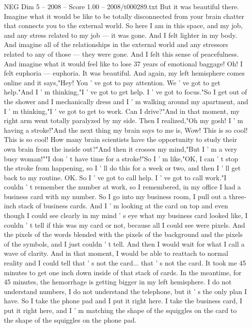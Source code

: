 \begin{textsample}{NEG Dim 5 – 2008 – Score 1.00 – 2008/t000289.txt}
But it was beautiful there.
Imagine what it would be like to be totally disconnected from your brain chatter that connects you to the external world.
So here I am in this space, and my job, and any stress related to my job — it was gone.
And I felt lighter in my body.
And imagine all of the relationships in the external world and any stressors related to any of those — they were gone.
And I felt this sense of peacefulness.
And imagine what it would feel like to lose 37 years of emotional baggage!
Oh!
I felt euphoria — euphoria.
It was beautiful.
And again, my left hemisphere comes online and it says,"Hey!
You ' ve got to pay attention.
We ' ve got to get help."And I ' m thinking,"I ' ve got to get help.
I ' ve got to focus."So I get out of the shower and I mechanically dress and I ' m walking around my apartment, and I ' m thinking,"I ' ve got to get to work.
Can I drive?"And in that moment, my right arm went totally paralyzed by my side.
Then I realized,"Oh my gosh!
I ' m having a stroke!"And the next thing my brain says to me is, Wow!
This is so cool!
This is so cool!
How many brain scientists have the opportunity to study their own brain from the inside out?"And then it crosses my mind,"But I ' m a very busy woman!""I don ' t have time for a stroke!"So I ' m like,"OK, I can ' t stop the stroke from happening, so I ' ll do this for a week or two, and then I ' ll get back to my routine.
OK.
So I ' ve got to call help.
I ' ve got to call work."I couldn ' t remember the number at work, so I remembered, in my office I had a business card with my number.
So I go into my business room, I pull out a three-inch stack of business cards.
And I ' m looking at the card on top and even though I could see clearly in my mind ' s eye what my business card looked like, I couldn ' t tell if this was my card or not, because all I could see were pixels.
And the pixels of the words blended with the pixels of the background and the pixels of the symbols, and I just couldn ' t tell.
And then I would wait for what I call a wave of clarity.
And in that moment, I would be able to reattach to normal reality and I could tell that ' s not the card... that ' s not the card.
It took me 45 minutes to get one inch down inside of that stack of cards.
In the meantime, for 45 minutes, the hemorrhage is getting bigger in my left hemisphere.
I do not understand numbers, I do not understand the telephone, but it ' s the only plan I have.
So I take the phone pad and I put it right here.
I take the business card, I put it right here, and I ' m matching the shape of the squiggles on the card to the shape of the squiggles on the phone pad.

\end{textsample}
